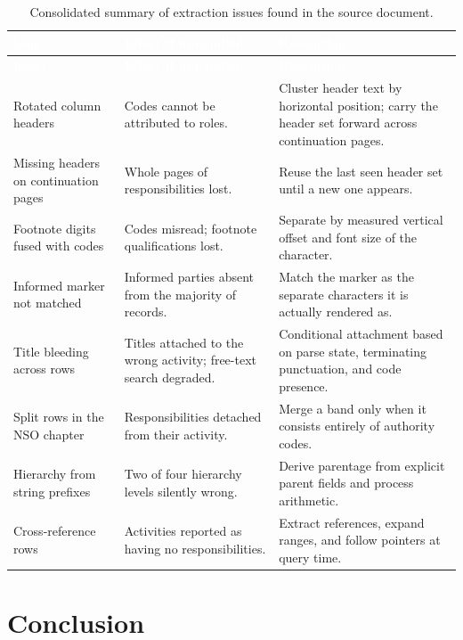 \begin{longtable}{|p{}|p{}|p{}|}
\caption{Consolidated summary of extraction issues found in the source document.}\label{tab:issues}\\
\hline
\rowcolor{myblue}\textcolor{white}{\textbf{Issue}} & \textcolor{white}{\textbf{Effect if unhandled}} & \textcolor{white}{\textbf{Resolution}} \\
\hline
\endfirsthead
\hline
\rowcolor{myblue}\textcolor{white}{\textbf{Issue}} & \textcolor{white}{\textbf{Effect if unhandled}} & \textcolor{white}{\textbf{Resolution}} \\
\hline
\endhead
Rotated column headers & Codes cannot be attributed to roles. & Cluster header text by horizontal position; carry the header set forward across continuation pages. \\ \hline
Missing headers on continuation pages & Whole pages of responsibilities lost. & Reuse the last seen header set until a new one appears. \\ \hline
Footnote digits fused with codes & Codes misread; footnote qualifications lost. & Separate by measured vertical offset and font size of the character. \\ \hline
Informed marker not matched & Informed parties absent from the majority of records. & Match the marker as the separate characters it is actually rendered as. \\ \hline
Title bleeding across rows & Titles attached to the wrong activity; free-text search degraded. & Conditional attachment based on parse state, terminating punctuation, and code presence. \\ \hline
Split rows in the NSO chapter & Responsibilities detached from their activity. & Merge a band only when it consists entirely of authority codes. \\ \hline
Hierarchy from string prefixes & Two of four hierarchy levels silently wrong. & Derive parentage from explicit parent fields and process arithmetic. \\ \hline
Cross-reference rows & Activities reported as having no responsibilities. & Extract references, expand ranges, and follow pointers at query time. \\ \hline
\end{longtable}

\section*{Conclusion}

